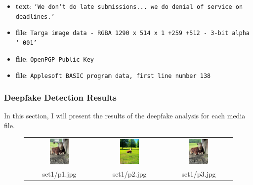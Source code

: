 \documentclass[pdflatex,sn-mathphys-num]{sn-jnl}
\begin{document}
\begin{itemize}
    \item \textbf{text}: \texttt{`We don't do late submissions... we do denial of service on deadlines.'}
    \item \textbf{file}: \texttt{Targa image data - RGBA 1290 x 514 x 1 +259 +512 - 3-bit alpha `\\001'}
    \item \textbf{file}: \texttt{OpenPGP Public Key}
    \item \textbf{file}: \texttt{Applesoft BASIC program data, first line number 138}
\end{itemize}

\pagebreak

\subsubsection{Deepfake Detection Results}

\par In this section, I will present the results of the deepfake analysis for each media file.

\begin{figure}[htbp]
    \centering
    \begin{tabular}{ccc}
        \includegraphics[width=0.3\textwidth]{images/set1/p1.jpg} &
        \includegraphics[width=0.3\textwidth]{images/set1/p2.jpg} &
        \includegraphics[width=0.3\textwidth]{images/set1/p3.jpg} \\
        set1/p1.jpg & set1/p2.jpg & set1/p3.jpg
    \end{tabular}
    \label{fig:set1_images}
\end{figure}
\end{document}
